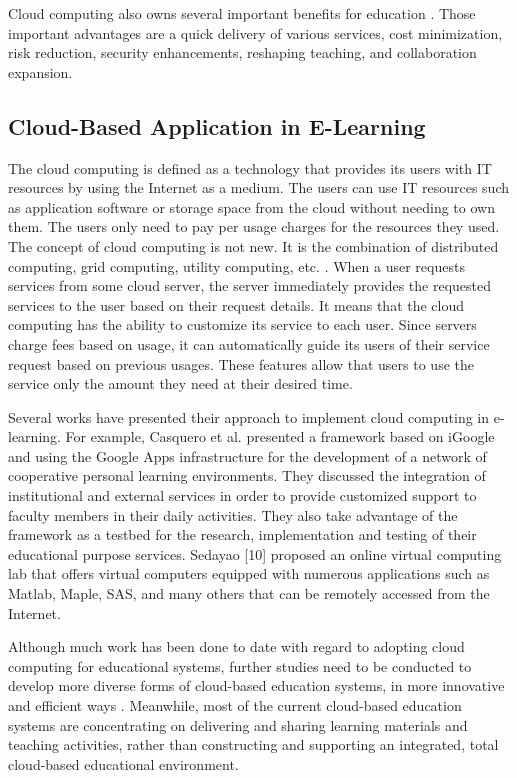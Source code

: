 \documentclass[journal]{vgtc}                %
\begin{document}
  Cloud computing also owns several important benefits for education \cite{Bouyer2014}. Those important advantages are a quick delivery of various services, cost minimization, risk reduction, security enhancements, reshaping teaching, and collaboration expansion.

  \subsection{Cloud-Based Application in E-Learning}
  The cloud computing is defined as a technology that provides its users with IT resources by using the Internet as a medium. The users can use IT resources such as application software or storage space from the cloud without needing to own them. The users only need to pay per usage charges for the resources they used. The concept of cloud computing is not new. It is the combination of distributed computing, grid computing, utility computing, etc. \cite{s110807835}. When a user requests services from some cloud server, the server immediately provides the requested services to the user based on their request details. It means that the cloud computing has the ability to customize its service to each user. Since servers charge fees based on usage, it can automatically guide its users of their service request based on previous usages. These features allow that users to use the service only the amount they need at their desired time.
  
  Several works have presented their approach to implement cloud computing in e-learning. For example, Casquero et al. \cite{casquero2008igoogle} presented a framework based on iGoogle and using the Google Apps infrastructure for the development of a network of cooperative personal learning environments. They discussed the integration of institutional and external services in order to provide customized support to faculty members in their daily activities. They also take advantage of the framework as a testbed for the research, implementation and testing of their educational purpose services. Sedayao [10] proposed an online virtual computing lab that offers virtual computers equipped with numerous applications such as Matlab, Maple, SAS, and many others that can be remotely accessed from the Internet.

  Although much work has been done to date with regard to adopting cloud computing for educational systems, further studies need to be conducted to develop more diverse forms of cloud-based education systems, in more innovative and efficient ways \cite{jeong2013content}. Meanwhile, most of the current cloud-based education systems are concentrating on delivering and sharing learning materials and teaching activities, rather than constructing and supporting an integrated, total cloud-based educational environment.
\end{document}
